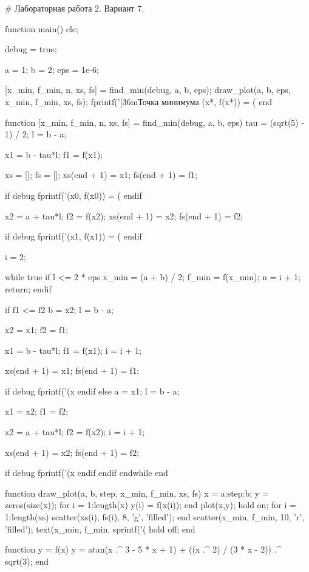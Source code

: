 # Лабораторная работа 2. Вариант 7.

function main()
  clc;

  debug = true;

  a = 1;
  b = 2;
  eps = 1e-6;

  [x_min, f_min, n, xs, fs] = find_min(debug, a, b, eps);
  draw_plot(a, b, eps, x_min, f_min, xs, fs);
  fprintf('\n{}[36mТочка минимума (x*, f(x*)) = (%
end

function [x_min, f_min, n, xs, fs] = find_min(debug, a, b, eps)
  tau = (sqrt(5) - 1) / 2;
  l = b - a;

  x1 = b - tau*l;
  f1 = f(x1);

  xs = [];
  fs = [];
  xs(end + 1) = x1;
  fs(end + 1) = f1;

  if debug
    fprintf('(x0, f(x0)) = (%
  endif

  x2 = a + tau*l;
  f2 = f(x2);
  xs(end + 1) = x2;
  fs(end + 1) = f2;

  if debug
    fprintf('(x1, f(x1)) = (%
  endif

  i = 2;

  while true
    if l <= 2 * eps
      x_min = (a + b) / 2;
      f_min = f(x_min);
      n = i + 1;
      return;
    endif

    if f1 <= f2
      b = x2;
      l = b - a;

      x2 = x1;
      f2 = f1;

      x1 = b - tau*l;
      f1 = f(x1);
      i = i + 1;

      xs(end + 1) = x1;
      fs(end + 1) = f1;

      if debug
        fprintf('(x%
      endif
    else
      a = x1;
      l = b - a;

      x1 = x2;
      f1 = f2;

      x2 = a + tau*l;
      f2 = f(x2);
      i = i + 1;

      xs(end + 1) = x2;
      fs(end + 1) = f2;

      if debug
        fprintf('(x%
      endif
    endif
  endwhile
end

function draw_plot(a, b, step, x_min, f_min, xs, fs)
  x = a:step:b;
  y = zeros(size(x));
  for i = 1:length(x)
      y(i) = f(x(i));
  end
  plot(x,y);
  hold on;
  for i = 1:length(xs)
      scatter(xs(i), fs(i), 8, 'g', 'filled');
  end
  scatter(x_min, f_min, 10, 'r', 'filled');
  text(x_min, f_min, sprintf('\n\n\n\n(%
  hold off;
end

function y = f(x)
  y = atan(x .^ 3 - 5 * x + 1) + ((x .^ 2) / (3 * x - 2)) .^ sqrt(3);
end

